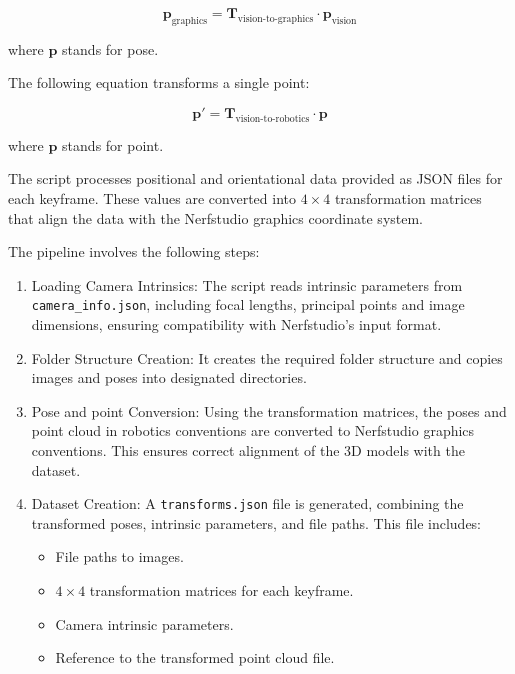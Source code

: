 \begin{equation} \label{pose_vis_to_graph}
    \bm{p}_{\text{graphics}} = \bm{T}_{\text{vision-to-graphics}} \cdot \bm{p}_{\text{vision}}
\end{equation}

where \(\bm{p}\) stands for pose.

The following equation transforms a single point:

\begin{equation} \label{point_rob_to_vis}
    \bm{p}' = \bm{T}_{\text{vision-to-robotics}} \cdot \bm{p}
\end{equation}

where \(\bm{p}\) stands for point.

The script processes positional and orientational data provided as JSON files for each keyframe. These values are converted into \(4\times4\) transformation matrices that align the data with the Nerfstudio graphics coordinate system.

The pipeline involves the following steps:
\begin{enumerate}
    \item Loading Camera Intrinsics: The script reads intrinsic parameters from \verb|camera_info.json|, including focal lengths, principal points and image dimensions, ensuring compatibility with Nerfstudio's input format.
    \item Folder Structure Creation: It creates the required folder structure and copies images and poses into designated directories.
    \item Pose and point Conversion: Using the transformation matrices, the poses and point cloud in robotics conventions are converted to Nerfstudio graphics conventions. This ensures correct alignment of the 3D models with the dataset.
    \item Dataset Creation: A \verb|transforms.json| file is generated, combining the transformed poses, intrinsic parameters, and file paths. This file includes:
    \begin{itemize}
        \item File paths to images.
        \item \(4\times4\) transformation matrices for each keyframe.
        \item Camera intrinsic parameters.
        \item Reference to the transformed point cloud file.
    \end{itemize}
\end{enumerate}

